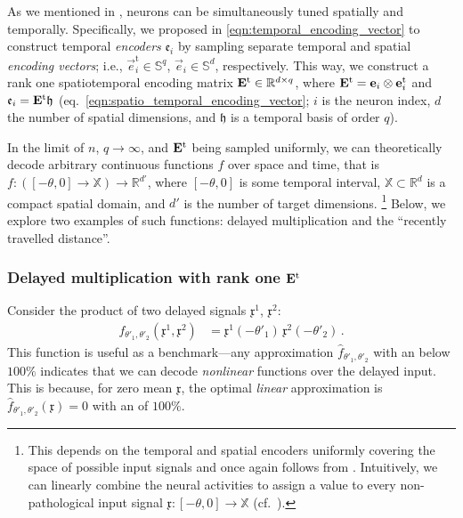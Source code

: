 As we mentioned in , neurons can be simultaneously tuned spatially and temporally.
Specifically, we proposed in \cref{eqn:temporal_encoding_vector} to construct temporal \emph{encoders} $\mathfrak{e}_i$ by sampling separate temporal and spatial \emph{encoding vectors}; i.e., $\vec e^\mathrm{t}_i \in \mathbb{S}^q$, $\vec e_i \in \mathbb{S}^d$, respectively.
This way, we construct a rank one spatiotemporal encoding matrix $\mathbf{E}^\mathrm{t} \in \mathbb{R}^{d \times q}$, where $\mathbf{E}^\mathrm{t} = \mathbf{e}_i \otimes \mathbf{e}^\mathrm{t}_i$ and $\mathfrak{e}_i = \mathbf{E}^\mathrm{t} \mathfrak{h}$ (eq.~\ref{eqn:spatio_temporal_encoding_vector}; $i$ is the neuron index, $d$ the number of spatial dimensions, and $\mathfrak{h}$ is a temporal basis of order $q$).

In the limit of $n$, $q \to \infty$, and $\mathbf{E}^\mathrm{t}$ being sampled uniformly, we can theoretically decode arbitrary continuous functions $f$ over space and time, that is $f : ([-\theta, 0] \longrightarrow \mathbb{X}) \longrightarrow \mathbb{R}^{d'}$, where $[-\theta, 0]$ is some temporal interval, $\mathbb{X} \subset \mathbb{R}^d$ is a compact spatial domain, and $d'$ is the number of target dimensions.%
\footnote{
This depends on the temporal and spatial encoders uniformly covering the space of possible input signals and once again follows from \citet{hornik1989multilayer}.
Intuitively, we can linearly combine the neural activities to assign a value to every non-pathological input signal $\mathfrak{x} : [-\theta, 0] \longrightarrow \mathbb{X}$ (cf.~).}
Below, we explore two examples of such functions: delayed multiplication and the \enquote{recently travelled distance}.

\subsubsection{Delayed multiplication with rank one $\mathbf{E}^\mathrm{t}$}
Consider the product of two delayed signals $\mathfrak{x}^1$, $\mathfrak{x}^2$:
\begin{align*}
	f_{\theta'_1, \theta'_2}(\mathfrak{x}^1, \mathfrak{x}^2) &= \mathfrak{x}^1 (- \theta'_1) \, \mathfrak{x}^2 (- \theta'_2) \,.
\end{align*}
This function is useful as a benchmark---any approximation $\hat f_{\theta'_1, \theta'_2}$ with an \NRMSE below $100\%$ indicates that we can decode \emph{nonlinear} functions over the delayed input.
This is because, for zero mean $\mathfrak{x}$, the optimal \emph{linear} approximation is $\hat f_{\theta'_1, \theta'_2}(\mathfrak{x}) = 0$ with an \NRMSE of $100\%$.

